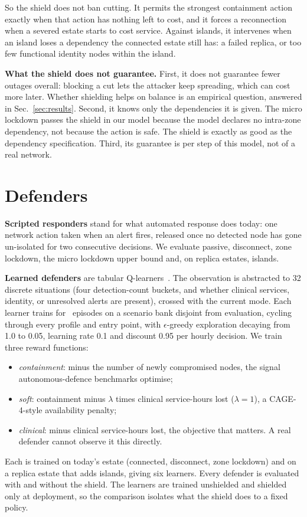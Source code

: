 \documentclass[conference,compsoc]{IEEEtran}
\begin{document}
So the shield does not ban cutting. It permits the strongest containment
action exactly when that action has nothing left to cost, and it forces a
reconnection when a severed estate starts to cost service. Against
\textsf{islands}, it intervenes when an island loses a dependency the
connected estate still has: a failed replica, or too few functional
identity nodes within the island.

\textbf{What the shield does not guarantee.} First, it does not guarantee
fewer outages overall: blocking a cut lets the attacker keep spreading,
which can cost more later. Whether shielding helps on balance is an
empirical question, answered in Sec.~\ref{sec:results}. Second, it knows
only the dependencies it is given. The micro lockdown passes the shield in
our model because the model declares no intra-zone dependency, not because
the action is safe. The shield is exactly as good as the dependency
specification. Third, its guarantee is per step of this model, not of a
real network.

\section{Defenders}
\label{sec:defenders}

\textbf{Scripted responders} stand for what automated response does today:
one network action taken when an alert fires, released once no detected
node has gone un-isolated for two consecutive decisions. We evaluate
\textsf{passive}, \textsf{disconnect}, \textsf{zone lockdown}, the micro
lockdown upper bound and, on replica estates, \textsf{islands}.

\textbf{Learned defenders} are tabular Q-learners~\cite{watkins1992}. The
observation is abstracted to 32 discrete situations (four detection-count
buckets, and whether clinical services, identity, or unresolved alerts are
present), crossed with the current mode. Each learner trains for
\numTrainEpisodes\ episodes on a scenario bank disjoint from evaluation,
cycling through every profile and entry point, with $\epsilon$-greedy
exploration decaying from 1.0 to 0.05, learning rate 0.1 and discount 0.95
per hourly decision. We train three reward functions:
\begin{itemize}
\item \emph{containment}: minus the number of newly compromised nodes, the
signal autonomous-defence benchmarks optimise;
\item \emph{soft}: containment minus $\lambda$ times clinical service-hours
lost ($\lambda=1$), a CAGE-4-style availability penalty;
\item \emph{clinical}: minus clinical service-hours lost, the objective
that matters. A real defender cannot observe it this directly.
\end{itemize}
Each is trained on today's estate (\textsf{connected}, \textsf{disconnect},
\textsf{zone lockdown}) and on a replica estate that adds \textsf{islands},
giving six learners. Every defender is evaluated with and without the
shield. The learners are trained unshielded and shielded only at
deployment, so the comparison isolates what the shield does to a fixed
policy.
\end{document}
